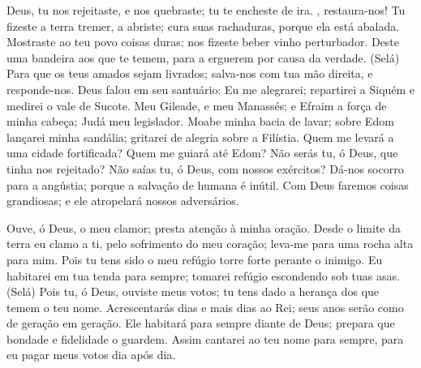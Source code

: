 {\PP 
  Deus, tu nos rejeitaste, e nos quebraste; tu te encheste de ira.
{},  restaura-nos!
  Tu fizeste a terra tremer,
{} a abriste; cura suas rachaduras, porque ela está abalada.
  Mostraste ao teu povo coisas duras; nos fizeste beber vinho perturbador.
  Deste uma bandeira aos que te temem, para a erguerem por causa da verdade.
 (Selá)
  Para que os teus amados sejam livrados; salva-nos com tua mão direita, e responde-nos.
  Deus falou em seu santuário: Eu me alegrarei; repartirei a Siquém e medirei o vale de Sucote.
  Meu
{} Gileade, e meu
{} Manassés; e Efraim
{} a força de minha cabeça; Judá
{} meu legislador.
  Moabe
{} minha bacia de lavar; sobre Edom lançarei minha sandália; gritarei de alegria sobre a Filístia.
  Quem me levará a uma cidade fortificada? Quem me guiará até Edom?
  Não serás tu, ó Deus, que tinha nos rejeitado? Não saías tu, ó Deus, com nossos exércitos?
  Dá-nos socorro para a angústia; porque a salvação de
{} humana é inútil.
  Com Deus faremos coisas grandiosas; e ele atropelará nossos adversários.
\par }


{\PP 
  Ouve, ó Deus, o meu clamor; presta atenção à minha oração.
  Desde o limite da terra eu clamo a ti, pelo sofrimento do meu coração; leva-me para uma rocha alta para mim.
  Pois tu tens sido o meu refúgio
{} torre forte perante o inimigo.
  Eu habitarei em tua tenda para sempre; tomarei refúgio
{} escondendo sob tuas asas. (Selá)
  Pois tu, ó Deus, ouviste meus votos; tu tens
{} dado a herança dos que temem o teu nome.
  Acrescentarás dias e mais dias ao Rei; seus anos serão como de geração em geração.
  Ele habitará para sempre diante de Deus; prepara que
{} bondade e fidelidade o guardem.
  Assim cantarei ao teu nome para sempre, para eu pagar meus votos dia após dia.
\par }


